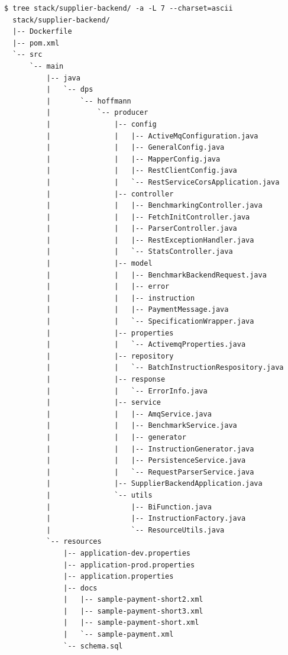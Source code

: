 \label{verb:supplierStruct}
\begin{lstlisting}[caption={Supplier Backend - Struktur},style=bashStyle]
  $ tree stack/supplier-backend/ -a -L 7 --charset=ascii
  stack/supplier-backend/
  |-- Dockerfile
  |-- pom.xml
  `-- src
      `-- main
          |-- java
          |   `-- dps
          |       `-- hoffmann
          |           `-- producer
          |               |-- config
          |               |   |-- ActiveMqConfiguration.java
          |               |   |-- GeneralConfig.java
          |               |   |-- MapperConfig.java
          |               |   |-- RestClientConfig.java
          |               |   `-- RestServiceCorsApplication.java
          |               |-- controller
          |               |   |-- BenchmarkingController.java
          |               |   |-- FetchInitController.java
          |               |   |-- ParserController.java
          |               |   |-- RestExceptionHandler.java
          |               |   `-- StatsController.java
          |               |-- model
          |               |   |-- BenchmarkBackendRequest.java
          |               |   |-- error
          |               |   |-- instruction
          |               |   |-- PaymentMessage.java
          |               |   `-- SpecificationWrapper.java
          |               |-- properties
          |               |   `-- ActivemqProperties.java
          |               |-- repository
          |               |   `-- BatchInstructionRespository.java
          |               |-- response
          |               |   `-- ErrorInfo.java
          |               |-- service
          |               |   |-- AmqService.java
          |               |   |-- BenchmarkService.java
          |               |   |-- generator
          |               |   |-- InstructionGenerator.java
          |               |   |-- PersistenceService.java
          |               |   `-- RequestParserService.java
          |               |-- SupplierBackendApplication.java
          |               `-- utils
          |                   |-- BiFunction.java
          |                   |-- InstructionFactory.java
          |                   `-- ResourceUtils.java
          `-- resources
              |-- application-dev.properties
              |-- application-prod.properties
              |-- application.properties
              |-- docs
              |   |-- sample-payment-short2.xml
              |   |-- sample-payment-short3.xml
              |   |-- sample-payment-short.xml
              |   `-- sample-payment.xml
              `-- schema.sql

\end{lstlisting}


